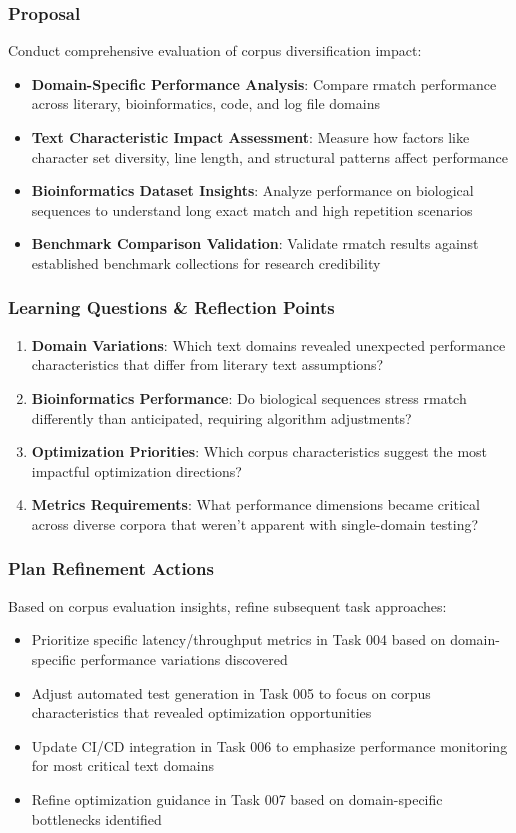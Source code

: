 \documentclass[11pt,a4paper]{article}
\begin{document}
\subsubsection{Proposal}
Conduct comprehensive evaluation of corpus diversification impact:
\begin{itemize}
    \item \textbf{Domain-Specific Performance Analysis}: Compare rmatch performance across literary, bioinformatics, code, and log file domains
    \item \textbf{Text Characteristic Impact Assessment}: Measure how factors like character set diversity, line length, and structural patterns affect performance
    \item \textbf{Bioinformatics Dataset Insights}: Analyze performance on biological sequences to understand long exact match and high repetition scenarios
    \item \textbf{Benchmark Comparison Validation}: Validate rmatch results against established benchmark collections for research credibility
\end{itemize}

\subsubsection{Learning Questions \& Reflection Points}
\begin{enumerate}
    \item \textbf{Domain Variations}: Which text domains revealed unexpected performance characteristics that differ from literary text assumptions?
    \item \textbf{Bioinformatics Performance}: Do biological sequences stress rmatch differently than anticipated, requiring algorithm adjustments?
    \item \textbf{Optimization Priorities}: Which corpus characteristics suggest the most impactful optimization directions?
    \item \textbf{Metrics Requirements}: What performance dimensions became critical across diverse corpora that weren't apparent with single-domain testing?
\end{enumerate}

\subsubsection{Plan Refinement Actions}
Based on corpus evaluation insights, refine subsequent task approaches:
\begin{itemize}
    \item Prioritize specific latency/throughput metrics in Task 004 based on domain-specific performance variations discovered
    \item Adjust automated test generation in Task 005 to focus on corpus characteristics that revealed optimization opportunities
    \item Update CI/CD integration in Task 006 to emphasize performance monitoring for most critical text domains
    \item Refine optimization guidance in Task 007 based on domain-specific bottlenecks identified
\end{itemize}
\end{document}
